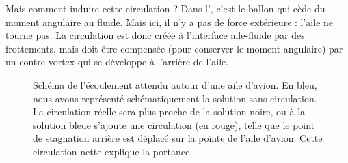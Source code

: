 Mais comment induire cette circulation ? Dans l', c'est le ballon qui cède du moment angulaire au fluide. Mais ici, il n'y a pas de force extérieure : l'aile ne tourne pas. La circulation est donc créée à l'interface aile-fluide par des frottements, mais doit être compensée (pour conserver le moment angulaire) par un contre-vortex qui se développe à l'arrière de l'aile.

\begin{figure}
  \scalebox{0.7}{}
   \caption{Schéma de l'écoulement attendu autour d'une aile d'avion. En bleu, nous avons représenté schématiquement la solution sans circulation. La circulation réelle sera plus proche de la solution noire, ou à la solution bleue s'ajoute une circulation (en rouge), telle que le point de stagnation arrière est déplacé sur la pointe de l'aile d'avion. Cette circulation nette explique la portance. }
   \label{fig:airfoil_schematic}
\end{figure}
